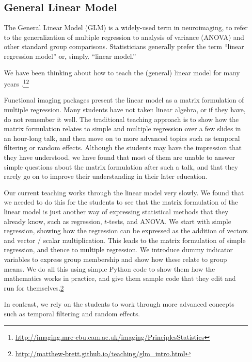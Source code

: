 \subsection{General Linear Model}

The General Linear Model (GLM) is a widely-used term in neuroimaging, to refer
to the generalization of multiple regression to analysis of variance (ANOVA)
and other standard group comparisons.  Statisticians generally prefer the term
``linear regression model'' or, simply, ``linear model.''

We have been thinking about how to teach the (general) linear model for many
years
\citep{poline2012general}.\footnote{\url{http://imaging.mrc-cbu.cam.ac.uk/imaging/PrinciplesStatistics}}\footnote{\url{http://matthew-brett.github.io/teaching/glm_intro.html}\label{glm_intro}}

Functional imaging packages present the linear model as a matrix formulation
of multiple regression.  Many students have not taken linear algebra, or if
they have, do not remember it well.  The traditional teaching approach is to
show how the matrix formulation relates to simple and multiple regression over
a few slides in an hour-long talk, and then move on to more advanced topics
such as temporal filtering or random effects.  Although the students may have
the impression that they have understood, we have found that most of them are
unable to answer simple questions about the matrix formulation after such a
talk, and that they rarely go on to improve their understanding in their later
education.

Our current teaching works through the linear model very slowly. We found that
we needed to do this for the students to see that the matrix formulation of
the linear model is just another way of expressing statistical methods that
they already know, such as regression, $t$-tests, and ANOVA.  We start with
simple regression, showing how the regression can be expressed as the addition
of vectors and vector / scalar multiplication.  This leads to the matrix
formulation of simple regression, and thence to multiple regression.  We
introduce dummy indicator variables to express group membership and show how
these relate to group means.  We do all this using simple Python code to show
them how the mathematics works in practice, and give them sample code that
they edit and run for themselves.\cref{glm_intro}

In contrast, we rely on the students to work through more advanced concepts
such as temporal filtering and random effects.

